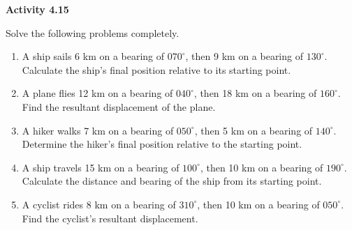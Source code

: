\vspace{0.3ex}
\noindent\textbf{Activity 4.15}

\vspace{0.2ex}

Solve the following problems completely.

\begin{enumerate}
    \item A ship sails 6 km on a bearing of \(070^\circ\), then 9 km on a bearing of \(130^\circ\). Calculate the ship's final position relative to its starting point.

    \item A plane flies 12 km on a bearing of \(040^\circ\), then 18 km on a bearing of \(160^\circ\). Find the resultant displacement of the plane.

    \item A hiker walks 7 km on a bearing of \(050^\circ\), then 5 km on a bearing of \(140^\circ\). Determine the hiker’s final position relative to the starting point.

    \item A ship travels 15 km on a bearing of \(100^\circ\), then 10 km on a bearing of \(190^\circ\). Calculate the distance and bearing of the ship from its starting point.

    \item A cyclist rides 8 km on a bearing of \(310^\circ\), then 10 km on a bearing of \(050^\circ\). Find the cyclist’s resultant displacement.





\end{enumerate}
